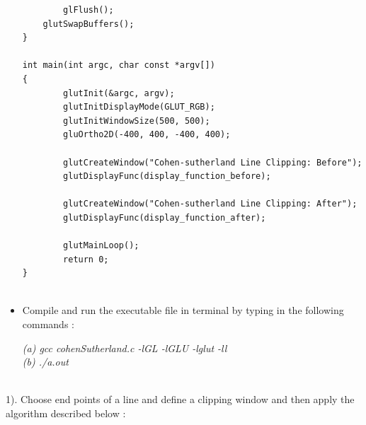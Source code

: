 \begin{itemize}
\begin{lstlisting}
        glFlush();
    glutSwapBuffers();
}

int main(int argc, char const *argv[])
{
        glutInit(&argc, argv);
        glutInitDisplayMode(GLUT_RGB);
        glutInitWindowSize(500, 500);
        gluOrtho2D(-400, 400, -400, 400);

        glutCreateWindow("Cohen-sutherland Line Clipping: Before");
        glutDisplayFunc(display_function_before);

        glutCreateWindow("Cohen-sutherland Line Clipping: After");
        glutDisplayFunc(display_function_after);

        glutMainLoop();
        return 0;
}


\end{lstlisting}

\vspace{0.5mm}

\item Compile and run the executable file in terminal by typing in the following commands : \\

\vspace{0.5mm} \flushleft

\textit{(a)\hspace{2mm} gcc cohenSutherland.c -lGL -lGLU -lglut -ll} \\
\textit{(b)\hspace{2mm} ./a.out}
\vspace*{1\baselineskip}
\end{itemize}

\\

1). Choose end points of a line and define a clipping window and then apply the algorithm described below :

